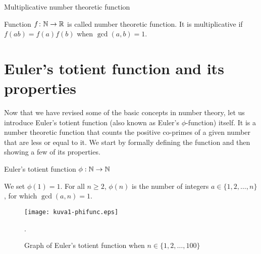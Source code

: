 \documentclass{article}
\begin{document}
\begin{definition}
Multiplicative number theoretic function

Function $f\colon \mathbb{N} \rightarrow \mathbb{R}$ is called number theoretic function. It is multiplicative if $f(ab) = f(a)f(b)$ when $\gcd(a, b)=1$.

\end{definition}

\section{Euler's totient function and its properties}

Now that we have revised some of the basic concepts in number theory, let us introduce Euler's totient function (also known as Euler's $\phi$-function) itself. It is a number theoretic function that counts the positive co-primes of a given number that are less or equal to it. We start by formally defining the function and then showing a few of its properties.

\begin{definition}
Euler's totient function $\phi: \mathbb{N} \rightarrow \mathbb{N}$

We set $\phi(1) = 1$. For all $n \geq 2$, $\phi(n)$ is the number of integers $a \in \{1,2,\dots,n\}$, for which $\gcd(a,n) = 1$.

\end{definition}


\begin{figure}[!htb]
    \centering
    \texttt{[image: kuva1-phifunc.eps]}
    \caption{Graph of Euler's totient function when $n\in\{1,2,\dots,100\}$}.
    \label{fig:k1}
\end{figure}

\clearpage
\end{document}
